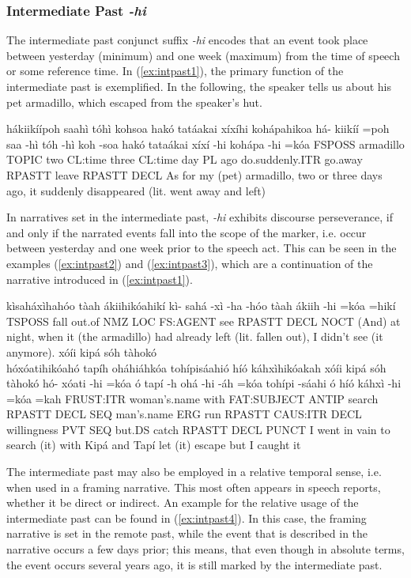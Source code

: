 \documentclass[a4paper, 12pt, oneside]{memoir}
\newcommand{\emh}[1]{\textit{#1}}
\begin{document}
\subsubsection{Intermediate Past \emh{-hi}}\label{s:intpast}
The intermediate past conjunct suffix \emh{-hi} encodes that an event took place between yesterday (minimum) and one week (maximum) from the time of speech or some reference time. In (\ref{ex:intpast1}), the primary function of the intermediate past is exemplified. In the following, the speaker tells us about his pet armadillo, which escaped from the speaker's hut. 
\begin{examples}
    \ex \label{ex:intpast1}
    \words hákiikíípoh saahì tóhì kohsoa hakó tatáakai xíxíhi kohápahikoa
    \bits há- kiikíí =poh saa -hì tóh -hì koh -soa hakó tataákai xíxí -hi kohápa -hi =kóa
    \gloss FSPOSS armadillo TOPIC two CL:time three CL:time day PL ago do.suddenly.ITR go.away RPASTT leave RPASTT DECL
    \tr As for my (pet) armadillo, two or three days ago, it suddenly disappeared (lit. went away and left)
\end{examples}
In narratives set in the intermediate past, \emh{-hi} exhibits discourse perseverance, if and only if the narrated events fall into the scope of the marker, i.e. occur between yesterday and one week prior to the speech act. This can be seen in the examples (\ref{ex:intpast2}) and (\ref{ex:intpast3}), which are a continuation of the narrative introduced in (\ref{ex:intpast1}).
\begin{examples}
    \ex \label{ex:intpast2}
    \words kìsaháxìhahóo tàah ákiihikóahikí
    \bits kì- sahá -xì -ha -hóo tàah ákiih -hi =kóa =hikí 
    \gloss TSPOSS fall out.of NMZ LOC FS:AGENT see RPASTT DECL NOCT
    \tr (And) at night, when it (the armadillo) had already left (lit. fallen out), I didn't see (it anymore).
    \ex \label{ex:intpast3}
    \newbaarucmd{\cl}{\baarujuncture{\texttt{==}}}
    \words xóíi kipá sóh tàhokó \\ hóxóatihikóahó tapíh oháhiáhkóa tohípisáahió híó káhxìhikóakah
    \bits xóíi kipá sóh tàhokó hó- xóati -hi =kóa \cl ó tapí -h ohá -hi -áh =kóa tohípi -sáahi \cl ó híó káhxì -hi =kóa =kah
    \gloss FRUST:ITR woman's.name with FAT:SUBJECT ANTIP search RPASTT DECL SEQ man's.name ERG run RPASTT CAUS:ITR DECL willingness PVT SEQ but.DS catch RPASTT DECL PUNCT
    \tr I went in vain to search (it) with Kipá and Tapí let (it) escape but I caught it
\end{examples}
The intermediate past may also be employed in a relative temporal sense, i.e. when used in a framing narrative. This most often appears in speech reports, whether it be direct or indirect. An example for the relative usage of the intermediate past can be found in (\ref{ex:intpast4}). In this case, the framing narrative is set in the remote past, while the event that is described in the narrative occurs a few days prior; this means, that even though in absolute terms, the event occurs several years ago, it is still marked by the intermediate past.
\end{document}
